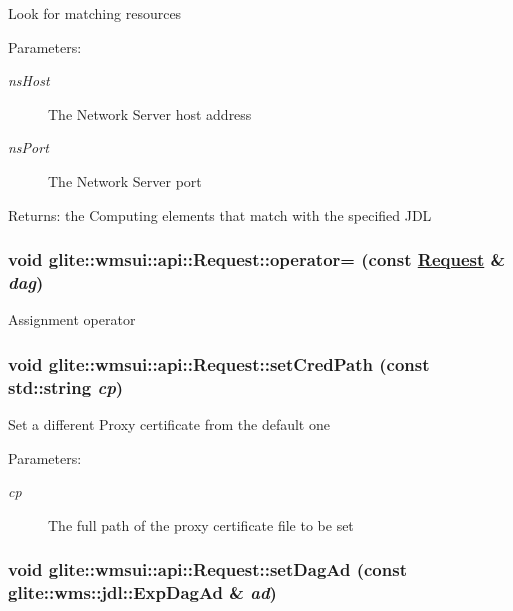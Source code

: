 Look for matching resources \begin{Desc}
\item[Parameters:]
\begin{description}
\item[{\em ns\-Host}]The Network Server host address \item[{\em ns\-Port}]The Network Server port \end{description}
\end{Desc}
\begin{Desc}
\item[Returns:]the Computing elements that match with the specified JDL \end{Desc}
\hypertarget{classglite_1_1wmsui_1_1api_1_1Request_z9_6}{
\subsubsection[operator=]{\setlength{\rightskip}{0pt plus 5cm}void glite::wmsui::api::Request::operator= (const \hyperlink{classglite_1_1wmsui_1_1api_1_1Request}{Request} \& {\em dag})}}
\label{classglite_1_1wmsui_1_1api_1_1Request_z9_6}


Assignment operator \hypertarget{classglite_1_1wmsui_1_1api_1_1Request_z11_0}{
\subsubsection[setCredPath]{\setlength{\rightskip}{0pt plus 5cm}void glite::wmsui::api::Request::set\-Cred\-Path (const std::string {\em cp})}}
\label{classglite_1_1wmsui_1_1api_1_1Request_z11_0}


Set a different Proxy certificate from the default one \begin{Desc}
\item[Parameters:]
\begin{description}
\item[{\em cp}]The full path of the proxy certificate file to be set \end{description}
\end{Desc}
\hypertarget{classglite_1_1wmsui_1_1api_1_1Request_z11_4}{
\subsubsection[setDagAd]{\setlength{\rightskip}{0pt plus 5cm}void glite::wmsui::api::Request::set\-Dag\-Ad (const glite::wms::jdl::Exp\-Dag\-Ad \& {\em ad})}}
\label{classglite_1_1wmsui_1_1api_1_1Request_z11_4}


